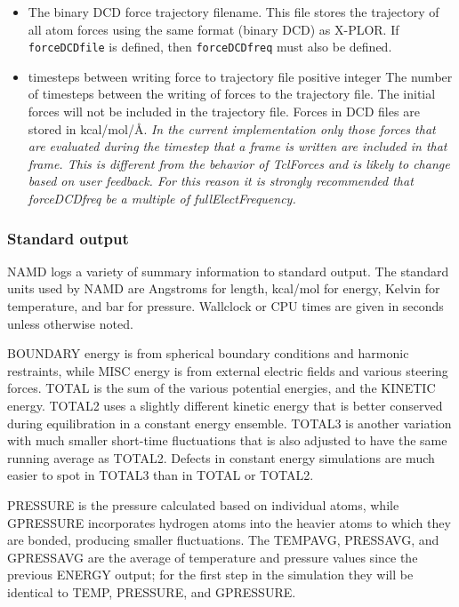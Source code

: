 \begin{itemize}
\item
{}
{
The binary DCD force trajectory filename.  
This file stores the trajectory of 
all atom forces using the same format (binary DCD) as X-PLOR.  
If {\tt forceDCDfile} is defined, then {\tt forceDCDfreq} must also 
be defined.  
}

\item
{}
{timesteps between writing force to trajectory file}
{positive integer}
{
The number of timesteps between the writing of 
forces to the trajectory file.  
The initial forces will not be included in the trajectory file.
Forces in DCD files are stored in kcal/mol/\AA.
{\em In the current implementation only those forces that are
evaluated during the timestep that a frame is written are
included in that frame.  This is different from the behavior
of TclForces and is likely to change based on user feedback.
For this reason it is strongly recommended that forceDCDfreq
be a multiple of fullElectFrequency.}
}


\end{itemize}

\subsubsection{Standard output}

NAMD logs a variety of summary information to standard output.
The standard units used by NAMD are
Angstroms for length, kcal/mol for energy,
Kelvin for temperature, and bar for pressure.
Wallclock or CPU times are given in seconds unless otherwise noted.

BOUNDARY energy is from spherical boundary conditions and harmonic restraints,
while MISC energy is from external electric fields and various steering forces.
TOTAL is the sum of the various potential energies, and the KINETIC energy.
TOTAL2 uses a slightly different kinetic energy that is better conserved
during equilibration in a constant energy ensemble.
TOTAL3 is another variation with much smaller short-time fluctuations that
is also adjusted to have the same running average as TOTAL2.
Defects in constant energy simulations are much easier to spot in TOTAL3
than in TOTAL or TOTAL2.

PRESSURE is the pressure calculated based on individual atoms, while
GPRESSURE incorporates hydrogen atoms into the heavier atoms to which
they are bonded, producing smaller fluctuations.
The TEMPAVG, PRESSAVG, and GPRESSAVG are the average of temperature and
pressure values since the previous ENERGY output; for the first step
in the simulation they will be identical to TEMP, PRESSURE, and GPRESSURE.

